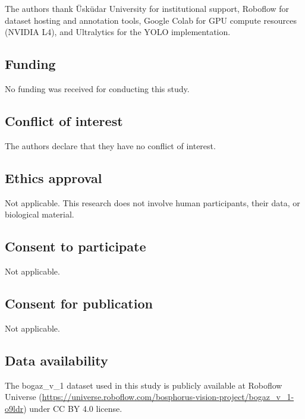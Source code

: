 \documentclass[pdflatex,sn-mathphys-num,Numbered]{sn-jnl}
\begin{document}

\begin{acknowledgements}
The authors thank \"{U}sk\"{u}dar University for institutional support, Roboflow for dataset hosting and annotation tools, Google Colab for GPU compute resources (NVIDIA L4), and Ultralytics for the YOLO implementation.
\end{acknowledgements}


\begin{declarations}

\subsection*{Funding}
No funding was received for conducting this study.

\subsection*{Conflict of interest}
The authors declare that they have no conflict of interest.

\subsection*{Ethics approval}
Not applicable. This research does not involve human participants, their data, or biological material.

\subsection*{Consent to participate}
Not applicable.

\subsection*{Consent for publication}
Not applicable.

\subsection*{Data availability}
The bogaz\_v\_1 dataset used in this study is publicly available at Roboflow Universe (\url{https://universe.roboflow.com/bosphorus-vision-project/bogaz_v_1-o9ldr}) under CC BY 4.0 license.


\end{declarations}
\end{document}

